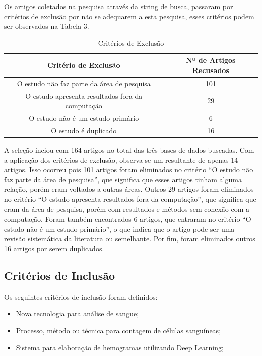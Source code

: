 Os artigos coletados na pesquisa através da string de busca, passaram por critérios de exclusão por não se adequarem a esta pesquisa, esses critérios podem ser observados na Tabela 3. 

\begin{table}[!htb]
	\centering
	\caption{Critérios de Exclusão}
	\label{tbl:exclusao}
	\begin{tabular}{|c|c|}
		\hline
		\textbf{Critério de Exclusão}                    & \textbf{Nº de Artigos Recusados} \\ \hline
		O estudo não faz parte da área de pesquisa       & 101                               \\ \hline
		O estudo apresenta resultados fora da computação & 29                                \\ \hline
		O estudo não é um estudo primário               & 6                                 \\ \hline
		O estudo é duplicado                              & 16                                \\ \hline
	\end{tabular}
	\vspace{6pt}
\end{table}

A seleção inciou com 164 artigos no total das três bases de dados buscadas. Com a aplicação dos critérios de exclusão, observa-se um resultante de apenas 14 artigos. Isso ocorreu pois 101 artigos foram eliminados no critério ``O estudo não faz parte da área de pesquisa'', que significa que esses artigos tinham alguma relação, porém eram voltados a outras áreas. Outros 29 artigos foram eliminados no critério ``O estudo apresenta resultados fora da computação'', que significa que eram da área de pesquisa, porém com resultados e métodos sem conexão com a computação. Foram também encontrados 6 artigos, que entraram no critério ``O estudo não é um estudo primário'', o que indica que o artigo pode ser uma revisão sistemática da literatura ou semelhante. Por fim, foram eliminados outros 16 artigos por serem duplicados.

\subsection{Critérios de Inclusão}

Os seguintes critérios de inclusão foram definidos:
\begin{itemize}
	\item Nova tecnologia para análise de sangue;
	\item Processo, método ou técnica para contagem de células sanguíneas;
	\item Sistema para elaboração de hemogramas utilizando Deep Learning;
\end{itemize}

